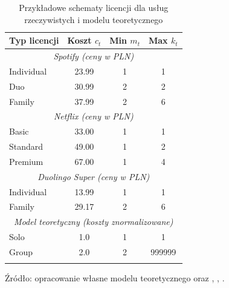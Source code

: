 \begin{table}[h!]
  \centering
  \caption{Przykładowe schematy licencji dla usług rzeczywistych i modelu teoretycznego}
  \begin{tabular}{lccc}
    \hline
    \textbf{Typ licencji} & \textbf{Koszt $c_t$} & \textbf{Min $m_t$} & \textbf{Max $k_t$} \\
    \hline
    \multicolumn{4}{c}{\textit{Spotify (ceny w PLN)}}                                      \\
    Individual            & 23.99                & 1                  & 1                  \\
    Duo                   & 30.99                & 2                  & 2                  \\
    Family                & 37.99                & 2                  & 6                  \\
    \hline
    \multicolumn{4}{c}{\textit{Netflix (ceny w PLN)}}                                      \\
    Basic                 & 33.00                & 1                  & 1                  \\
    Standard              & 49.00                & 1                  & 2                  \\
    Premium               & 67.00                & 1                  & 4                  \\
    \hline
    \multicolumn{4}{c}{\textit{Duolingo Super (ceny w PLN)}}                               \\
    Individual            & 13.99                & 1                  & 1                  \\
    Family                & 29.17                & 2                  & 6                  \\
    \hline
    \multicolumn{4}{c}{\textit{Model teoretyczny (koszty znormalizowane)}}                 \\
    Solo                  & 1.0                  & 1                  & 1                  \\
    Group                 & 2.0                  & 2                  & 999999             \\
    \hline
    \label{tab:license_models_real}
  \end{tabular}

  Źródło: opracowanie własne modelu teoretycznego oraz \cite{spotify_price2024}, \cite{spotify_price2025}, \cite{duolingo_app2024}.

\end{table}


